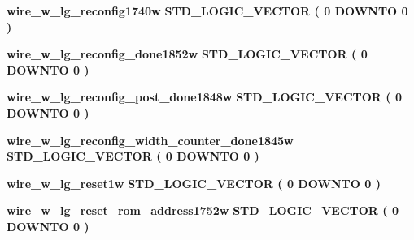 \begin{DoxyCompactItemize}
{\bf wire\+\_\+w\+\_\+lg\+\_\+reconfig1740w} {\bfseries \textcolor{comment}{S\+T\+D\+\_\+\+L\+O\+G\+I\+C\+\_\+\+V\+E\+C\+T\+OR}\textcolor{vhdlchar}{ }\textcolor{vhdlchar}{(}\textcolor{vhdlchar}{ }\textcolor{vhdlchar}{ } \textcolor{vhdldigit}{0} \textcolor{vhdlchar}{ }\textcolor{keywordflow}{D\+O\+W\+N\+TO}\textcolor{vhdlchar}{ }\textcolor{vhdlchar}{ } \textcolor{vhdldigit}{0} \textcolor{vhdlchar}{ }\textcolor{vhdlchar}{)}\textcolor{vhdlchar}{ }} 
\item 
{\bf wire\+\_\+w\+\_\+lg\+\_\+reconfig\+\_\+done1852w} {\bfseries \textcolor{comment}{S\+T\+D\+\_\+\+L\+O\+G\+I\+C\+\_\+\+V\+E\+C\+T\+OR}\textcolor{vhdlchar}{ }\textcolor{vhdlchar}{(}\textcolor{vhdlchar}{ }\textcolor{vhdlchar}{ } \textcolor{vhdldigit}{0} \textcolor{vhdlchar}{ }\textcolor{keywordflow}{D\+O\+W\+N\+TO}\textcolor{vhdlchar}{ }\textcolor{vhdlchar}{ } \textcolor{vhdldigit}{0} \textcolor{vhdlchar}{ }\textcolor{vhdlchar}{)}\textcolor{vhdlchar}{ }} 
\item 
{\bf wire\+\_\+w\+\_\+lg\+\_\+reconfig\+\_\+post\+\_\+done1848w} {\bfseries \textcolor{comment}{S\+T\+D\+\_\+\+L\+O\+G\+I\+C\+\_\+\+V\+E\+C\+T\+OR}\textcolor{vhdlchar}{ }\textcolor{vhdlchar}{(}\textcolor{vhdlchar}{ }\textcolor{vhdlchar}{ } \textcolor{vhdldigit}{0} \textcolor{vhdlchar}{ }\textcolor{keywordflow}{D\+O\+W\+N\+TO}\textcolor{vhdlchar}{ }\textcolor{vhdlchar}{ } \textcolor{vhdldigit}{0} \textcolor{vhdlchar}{ }\textcolor{vhdlchar}{)}\textcolor{vhdlchar}{ }} 
\item 
{\bf wire\+\_\+w\+\_\+lg\+\_\+reconfig\+\_\+width\+\_\+counter\+\_\+done1845w} {\bfseries \textcolor{comment}{S\+T\+D\+\_\+\+L\+O\+G\+I\+C\+\_\+\+V\+E\+C\+T\+OR}\textcolor{vhdlchar}{ }\textcolor{vhdlchar}{(}\textcolor{vhdlchar}{ }\textcolor{vhdlchar}{ } \textcolor{vhdldigit}{0} \textcolor{vhdlchar}{ }\textcolor{keywordflow}{D\+O\+W\+N\+TO}\textcolor{vhdlchar}{ }\textcolor{vhdlchar}{ } \textcolor{vhdldigit}{0} \textcolor{vhdlchar}{ }\textcolor{vhdlchar}{)}\textcolor{vhdlchar}{ }} 
\item 
{\bf wire\+\_\+w\+\_\+lg\+\_\+reset1w} {\bfseries \textcolor{comment}{S\+T\+D\+\_\+\+L\+O\+G\+I\+C\+\_\+\+V\+E\+C\+T\+OR}\textcolor{vhdlchar}{ }\textcolor{vhdlchar}{(}\textcolor{vhdlchar}{ }\textcolor{vhdlchar}{ } \textcolor{vhdldigit}{0} \textcolor{vhdlchar}{ }\textcolor{keywordflow}{D\+O\+W\+N\+TO}\textcolor{vhdlchar}{ }\textcolor{vhdlchar}{ } \textcolor{vhdldigit}{0} \textcolor{vhdlchar}{ }\textcolor{vhdlchar}{)}\textcolor{vhdlchar}{ }} 
\item 
{\bf wire\+\_\+w\+\_\+lg\+\_\+reset\+\_\+rom\+\_\+address1752w} {\bfseries \textcolor{comment}{S\+T\+D\+\_\+\+L\+O\+G\+I\+C\+\_\+\+V\+E\+C\+T\+OR}\textcolor{vhdlchar}{ }\textcolor{vhdlchar}{(}\textcolor{vhdlchar}{ }\textcolor{vhdlchar}{ } \textcolor{vhdldigit}{0} \textcolor{vhdlchar}{ }\textcolor{keywordflow}{D\+O\+W\+N\+TO}\textcolor{vhdlchar}{ }\textcolor{vhdlchar}{ } \textcolor{vhdldigit}{0} \textcolor{vhdlchar}{ }\textcolor{vhdlchar}{)}\textcolor{vhdlchar}{ }} 

\end{DoxyCompactItemize}

